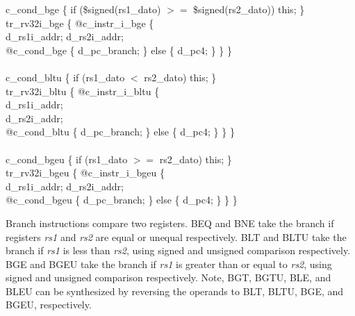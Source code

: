 {%
\indent c\_cond\_bge \{ if (\$signed(rs1\_dato) $>=$ \$signed(rs2\_dato)) this; \}\\%
\indent tr\_rv32i\_bge \{ @c\_instr\_i\_bge \{ \\%
\indent \hspace{\parindent} d\_rs1i\_addr; d\_rs2i\_addr; \\%
\indent \hspace{\parindent} @c\_cond\_bge \{ d\_pc\_branch; \}  	else \{ d\_pc4; \} \} \} \\%
\\
\indent c\_cond\_bltu \{ if (rs1\_dato $<$ rs2\_dato) this; \}\\%
\indent tr\_rv32i\_bltu \{ @c\_instr\_i\_bltu \{ \\%
\indent \hspace{\parindent} d\_rs1i\_addr; \\%
\indent \hspace{\parindent} d\_rs2i\_addr; \\%
\indent \hspace{\parindent} @c\_cond\_bltu \{ d\_pc\_branch; \}  	else \{ d\_pc4; \} \} \} \\%
\\
\indent c\_cond\_bgeu \{ if (rs1\_dato $>=$ rs2\_dato) this; \}\\%
\indent tr\_rv32i\_bgeu \{ @c\_instr\_i\_bgeu \{ \\%
\indent \hspace{\parindent} d\_rs1i\_addr; d\_rs2i\_addr; \\%
\indent \hspace{\parindent} @c\_cond\_bgeu \{ d\_pc\_branch; \}  	else \{ d\_pc4; \} \} \} \\%
}

Branch instructions compare two registers.  BEQ and BNE take the
branch if registers {\em rs1} and {\em rs2} are equal or unequal
respectively.  BLT and BLTU take the branch if {\em rs1} is less than
{\em rs2}, using signed and unsigned comparison respectively.  BGE and
BGEU take the branch if {\em rs1} is greater than or equal to {\em rs2},
using signed and unsigned comparison respectively. Note, BGT, BGTU,
BLE, and BLEU can be synthesized by reversing the operands to BLT,
BLTU, BGE, and BGEU, respectively.

